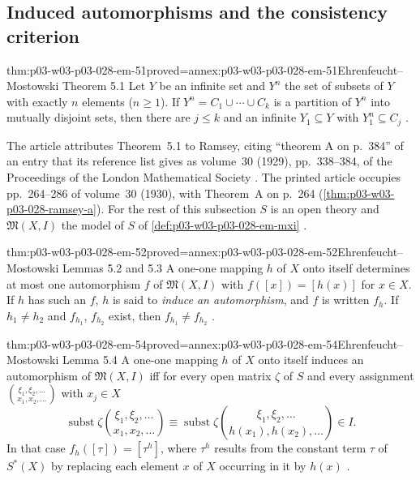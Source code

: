 \subsection{Induced automorphisms and the consistency criterion}
\label{sec:p03-w03-p03-028-em-induced}

\begin{hbcorollary}{thm:p03-w03-p03-028-em-51}{proved=annex:p03-w03-p03-028-em-51}{Ehrenfeucht--Mostowski Theorem 5.1}
Let \(Y\) be an infinite set and \(Y^n\) the set of subsets of \(Y\) with
exactly \(n\) elements (\(n\geq1\)).  If
\(Y^n=C_1\cup\cdots\cup C_k\) is a partition of \(Y^n\) into mutually disjoint
sets, then there are \(j\leq k\) and an infinite \(Y_1\subseteq Y\) with
\(Y_1^n\subseteq C_j\) \cite[Theorem~5.1, p.~57]{EhrenfeuchtMostowski1956}.
\end{hbcorollary}

The article attributes Theorem~5.1 to Ramsey, citing ``theorem A on p.~384''
of an entry that its reference list gives as volume~30 (1929), pp.~338--384,
of the Proceedings of the London Mathematical Society
\cite[pp.~57, 68]{EhrenfeuchtMostowski1956}.  The printed article occupies
pp.~264--286 of volume~30 (1930), with Theorem~A on p.~264
(\cref{thm:p03-w03-p03-028-ramsey-a}).  For the rest of this subsection \(S\)
is an open theory and \(\mathfrak M(X,I)\) the model of \(S\) of
\cref{def:p03-w03-p03-028-em-mxi} \cite[p.~57]{EhrenfeuchtMostowski1956}.

\begin{hblemma}{thm:p03-w03-p03-028-em-52}{proved=annex:p03-w03-p03-028-em-52}{Ehrenfeucht--Mostowski Lemmas 5.2 and 5.3}
A one-one mapping \(h\) of \(X\) onto itself determines at most one
automorphism \(f\) of \(\mathfrak M(X,I)\) with \(f([x])=[h(x)]\) for
\(x\in X\).  If \(h\) has such an \(f\), \(h\) is said to \emph{induce an
automorphism}, and \(f\) is written \(f_h\).  If \(h_1\neq h_2\) and
\(f_{h_1}\), \(f_{h_2}\) exist, then \(f_{h_1}\neq f_{h_2}\)
\cite[Lemmas~5.2--5.3, p.~57]{EhrenfeuchtMostowski1956}.
\end{hblemma}

\begin{hblemma}{thm:p03-w03-p03-028-em-54}{proved=annex:p03-w03-p03-028-em-54}{Ehrenfeucht--Mostowski Lemma 5.4}
A one-one mapping \(h\) of \(X\) onto itself induces an automorphism of
\(\mathfrak M(X,I)\) iff for every open matrix \(\zeta\) of \(S\) and every
assignment \(\binom{\xi_1,\xi_2,\ldots}{x_1,x_2,\ldots}\) with
\(x_j\in X\) \cite[Lemma~5.4, p.~57, proof pp.~57--59]{EhrenfeuchtMostowski1956}
\begin{equation}
  \operatorname{subst}\zeta\binom{\xi_1,\xi_2,\ldots}{x_1,x_2,\ldots}
  \equiv
  \operatorname{subst}\zeta\binom{\xi_1,\xi_2,\ldots}{h(x_1),h(x_2),\ldots}
  \in I .
  \tag{5.4.1}
\end{equation}
In that case \(f_h([\tau])=[\tau^h]\), where \(\tau^h\) results from the
constant term \(\tau\) of \(S^*(X)\) by replacing each element \(x\) of \(X\)
occurring in it by \(h(x)\) \cite[p.~58]{EhrenfeuchtMostowski1956}.
\end{hblemma}

